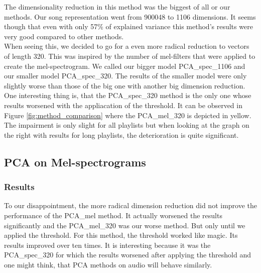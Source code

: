 The dimensionality reduction in this method was the biggest of all or our methods. Our song representation went from 900048 to 1106 dimensions. It seems though that even with only 57\% of explained variance this method's results were very good compared to other methods. \\
When seeing this, we decided to go for a even more radical reduction to vectors of length 320. This was inspired by the number of mel-filters that were applied to create the mel-spectrogram. We called our bigger model PCA\_spec\_1106 and our smaller model PCA\_spec\_320.  The results of the smaller model were only slightly worse than those of the big one with another big dimension reduction. One interesting thing is, that the PCA\_spec\_320 method is the only one whose results worsened with the appliacation of the threshold. It can be observed in Figure \ref{fig:method_comparison} where the PCA\_mel\_320 is depicted in yellow. The impairment is only slight for all playlists but when looking at the graph on the right with results for long playlists, the deterioration is quite significant. \\

\subsection{PCA on Mel-spectrograms}

\subsubsection{Results}
To our disappointment, the more radical dimension reduction did not improve the performance of the PCA\_mel method. It actually worsened the results significantly and the PCA\_mel\_320 was our worse method. But only until we applied the threshold. For this method, the threshold worked like magic. Its results improved over ten times. It is interesting because it was the PCA\_spec\_320 for which the results worsened after applying the threshold and one might think, that PCA methods on audio will behave similarly.

